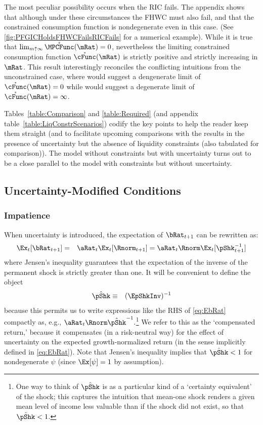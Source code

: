 \documentclass[titlepage]{\econtex}\providecommand{\texname}{BufferStockTheory}%
\begin{document}
The most peculiar possibility occurs when the RIC fails.  The appendix shows that although under these circumstances the FHWC
must also fail, and that the constrained consumption function is nondegenerate even in
this case.  (See \ref{fig:PFGICHoldsFHWCFailsRICFails} for a numerical example).  While it is true that $\lim_{m \uparrow \infty}
\mathring{\MPCFunc}(\mRat) = 0$, nevertheless the limiting constrained
consumption function $\mathring{\cFunc}(\mRat)$ is strictly positive
and strictly increasing in $\mRat$.  This result interestingly
reconciles the conflicting intuitions from the unconstrained case,
where  would suggest a dengenerate limit of
$\mathring{\cFunc}(\mRat)=0$ while  would suggest a
degenerate limit of $\mathring{\cFunc}(\mRat)=\infty$.

Tables~\ref{table:Comparison} and \ref{table:Required} (and appendix
table~\ref{table:LiqConstrScenarios}) codify the key points to help
the reader keep them straight (and to facilitate upcoming comparisons
with the results in the presence of uncertainty
but the absence of liquidity constraints (also tabulated for comparison)).  The model without constraints but with uncertainty turns out to be a close parallel to the model with constraints but without uncertainty.

\hypertarget{Uncertainty-Modified-Conditions}{}
\subsection{Uncertainty-Modified Conditions}
\subsubsection{Impatience}

When uncertainty is introduced, the expectation of $\bRat_{t+1}$ can be rewritten as:
\begin{eqnarray}
  \Ex_{t}[\bRat_{t+1}] & = &  \aRat_{t}\Ex_{t}[\Rnorm_{t+1}] = \aRat_{t}\Rnorm\Ex_{t}[\pShk_{t+1}^{-1}] \label{eq:EbRat}
\end{eqnarray}
where Jensen's inequality guarantees that the expectation of the inverse of the permanent
shock is strictly greater than one.  It will be convenient to define the object
\begin{eqnarray*}
  \InvEpShkInv & \equiv & (\EpShkInv)^{-1}
\end{eqnarray*}
because this permits us to write expressions like the RHS of
\eqref{eq:EbRat} compactly as, e.g., $\aRat_{t}\Rnorm
\InvEpShkInv^{-1}.$\footnote{One way to think of $\InvEpShkInv$ is as
  a particular kind of a `certainty equivalent' of the shock; this
  captures the intuition that mean-one shock renders a given mean
  level of income less valuable than if the shock did not exist, so
  that $\InvEpShkInv < 1$.}  We refer to this as the `compensated return,' because it compensates (in a risk-neutral way) for the effect of
uncertainty on the expected growth-normalized return (in the sense implicitly defined in
\eqref{eq:EbRat}).  Note that Jensen's inequality implies that $\InvEpShkInv < 1$ for nondegenerate $\psi$ (since
$\Ex[\psi]=1$ by assumption).
\end{document}
